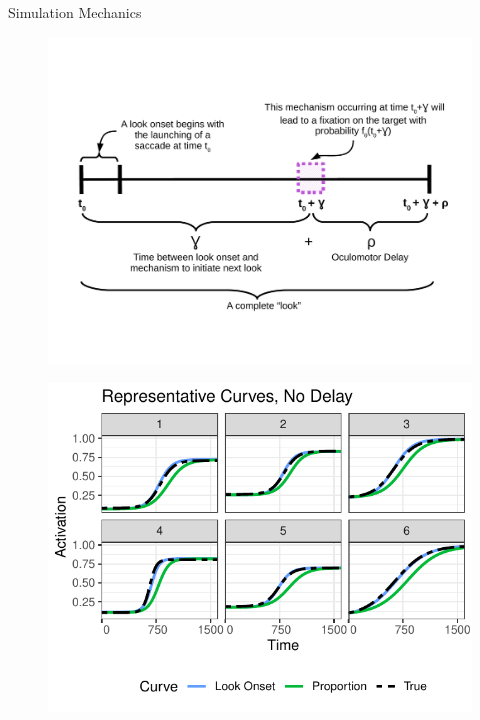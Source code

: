 \documentclass{beamer}
\begin{document}
\begin{frame}{Simulation Mechanics}

\vspace{-2.5mm}
\begin{figure}
\centering
\includegraphics[scale=0.4]{look_comp.pdf}
\end{figure}
\end{frame}




\begin{frame}
\begin{figure}[H]
\centering
\includegraphics{rep_curves_no_delay.pdf}
\end{figure}
\end{frame}
\end{document}
